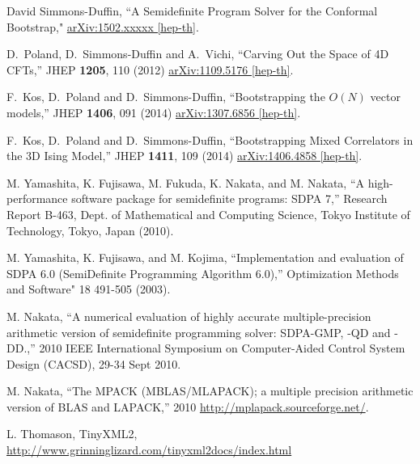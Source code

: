 \documentclass[12pt]{article}
\numberwithin{equation}{section}
\begin{document}
\begin{thebibliography}{9}

  David Simmons-Duffin,
  ``A Semidefinite Program Solver for the Conformal Bootstrap,"
  \href{http://arXiv.org}{arXiv:1502.xxxxx [hep-th]}.

  D.~Poland, D.~Simmons-Duffin and A.~Vichi,
  ``Carving Out the Space of 4D CFTs,''
  JHEP {\bf 1205}, 110 (2012)
  \href{http://arXiv.org/abs/1109.5176}{arXiv:1109.5176 [hep-th]}.
  
  F.~Kos, D.~Poland and D.~Simmons-Duffin,
  ``Bootstrapping the $O(N)$ vector models,''
  JHEP {\bf 1406}, 091 (2014)
  \href{http://arXiv.org/abs/1307.6856}{arXiv:1307.6856 [hep-th]}.

  F.~Kos, D.~Poland and D.~Simmons-Duffin,
  ``Bootstrapping Mixed Correlators in the 3D Ising Model,''
  JHEP {\bf 1411}, 109 (2014)
  \href{http://arXiv.org/abs/1406.4858}{arXiv:1406.4858 [hep-th]}.

  M. Yamashita, K. Fujisawa, M. Fukuda, K. Nakata, and M. Nakata,
  ``A high-performance software package for semidefinite programs: SDPA 7,''
   Research Report B-463, Dept. of Mathematical and Computing Science, Tokyo Institute of Technology, Tokyo, Japan (2010).

  M. Yamashita, K. Fujisawa, and M. Kojima,
  ``Implementation and evaluation of SDPA 6.0 (SemiDefinite Programming Algorithm 6.0),''
  Optimization Methods and Software" 18 491-505 (2003).

  M. Nakata,
  ``A numerical evaluation of highly accurate multiple-precision arithmetic version of semidefinite programming solver: SDPA-GMP, -QD and -DD.,''
  2010 IEEE International Symposium on Computer-Aided Control System Design (CACSD), 29-34 Sept 2010.

  M. Nakata,
  ``The MPACK (MBLAS/MLAPACK); a multiple precision arithmetic version of BLAS and LAPACK,''
  2010
  \href{http://mplapack.sourceforge.net/}{http://mplapack.sourceforge.net/}.

  L. Thomason,
  TinyXML2,
  \href{http://www.grinninglizard.com/tinyxml2docs/index.html}{http://www.grinninglizard.com/tinyxml2docs/index.html}

\end{thebibliography}
\end{document}
